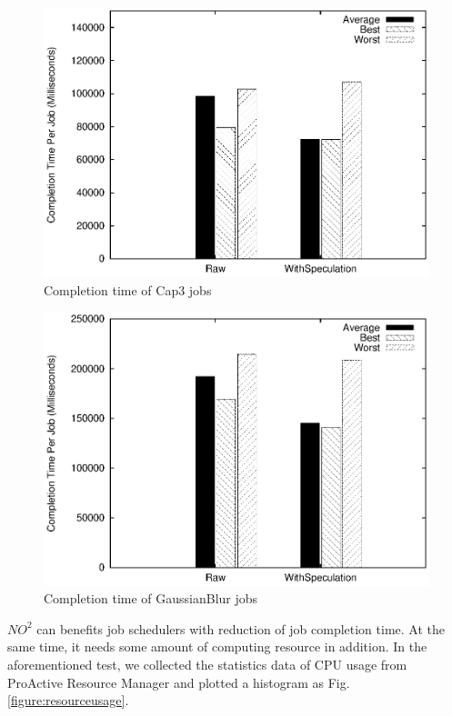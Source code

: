 \begin{figure}
\centering
\includegraphics[width=0.9\columnwidth]{figures/completiontime_cap3.eps}
\caption{Completion time of Cap3 jobs}
\label{figure:completiontime_cap3}
\end{figure}

\begin{figure}
\centering
\includegraphics[width=0.9\columnwidth]{figures/completiontime_gaussianblur.eps}
\caption{Completion time of GaussianBlur jobs}
\label{figure:completiontime_gaussianblur}
\end{figure}

$NO^2$ can benefits job schedulers with reduction of job completion time. At
the same time, it needs some amount of computing resource in addition. In the aforementioned
test, we collected the statistics data of CPU usage from ProActive Resource Manager and
plotted a histogram as Fig. \ref{figure:resourceusage}.


